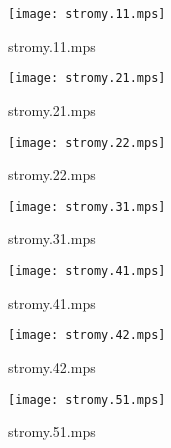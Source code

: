 \documentclass[letterpaper,10pt]{article}
\begin{document}
\begin{figure}
    \centering
    \texttt{[image: stromy.11.mps]}
    \caption{stromy.11.mps}
\end{figure}

\begin{figure}
    \centering
    \texttt{[image: stromy.21.mps]}
    \caption{stromy.21.mps}
\end{figure}

\begin{figure}
    \centering
    \texttt{[image: stromy.22.mps]}
    \caption{stromy.22.mps}
\end{figure}

\begin{figure}
    \centering
    \texttt{[image: stromy.31.mps]}
    \caption{stromy.31.mps}
\end{figure}

\begin{figure}
    \centering
    \texttt{[image: stromy.41.mps]}
    \caption{stromy.41.mps}
\end{figure}

\begin{figure}
    \centering
    \texttt{[image: stromy.42.mps]}
    \caption{stromy.42.mps}
\end{figure}

\begin{figure}
    \centering
    \texttt{[image: stromy.51.mps]}
    \caption{stromy.51.mps}
\end{figure}
\end{document}
